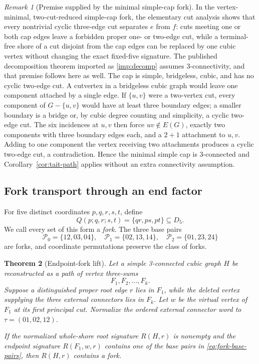\documentclass[11pt]{article}
\newtheorem{theorem}{Theorem}[section]
\theoremstyle{definition}
\theoremstyle{remark}
\newtheorem{remark}[theorem]{Remark}
\begin{document}
\begin{remark}[Premise supplied by the minimal simple-cap fork]
In the vertex-minimal, two-cut-reduced simple-cap fork, the elementary
cut analysis shows that every nontrivial cyclic three-edge cut
separates \(e\) from \(f\): cuts meeting one or both cap edges leave a
forbidden proper one- or two-edge cut, while a terminal-free shore of
a cut disjoint from the cap edges can be replaced by one cubic vertex
without changing the exact fixed-five signature.  The published
decomposition theorem imported as \ref{imp:decomp} assumes
3-connectivity, and that premise follows here as well.  The cap is
simple, bridgeless, cubic, and has no cyclic two-edge cut.  A cutvertex
in a bridgeless cubic graph would leave one component attached by a
single edge.  If \(\{u,v\}\) were a two-vertex cut, every component of
\(G-\{u,v\}\) would have at least three boundary edges; a smaller
boundary is a bridge or, by cubic degree counting and simplicity, a
cyclic two-edge cut.  The six incidences at \(u,v\) then force
\(uv\notin E(G)\), exactly two components with three boundary edges
each, and a \(2+1\) attachment to \(u,v\).  Adding to one component the
vertex receiving two attachments produces a cyclic two-edge cut, a
contradiction.  Hence the minimal simple cap is 3-connected and
Corollary~\ref{cor:tait-path} applies without an extra connectivity
assumption.
\end{remark}

\subsection{Fork transport through an end factor}

For five distinct coordinates \(p,q,r,s,t\), define
\[
                 Q(p;q,r;s,t)=\{qr,ps,pt\}\subseteq D_5.       \tag{6.16}
\]
We call every set of this form a \emph{fork}.  The three base pairs
\[
 \mathcal P_0=\{12,03,04\},\quad
 \mathcal P_1=\{02,13,14\},\quad
 \mathcal P_2=\{01,23,24\}                                  \tag{6.17}
\label{eq:fork-base-pairs}
\]
are forks, and coordinate permutations preserve the class of forks.

\begin{theorem}[Endpoint-fork lift]
\label{thm:endpoint-fork-lift}
Let a simple 3-connected cubic graph \(H\) be reconstructed as a path
of vertex three-sums
\[
                         F_1,F_2,\ldots,F_k.
\]
Suppose a distinguished proper root edge \(r\) lies in \(F_1\), while
the deleted vertex supplying the three external connectors lies in
\(F_k\).  Let \(w\) be the virtual vertex of \(F_1\) at its first
principal cut.  Normalize the ordered external connector word to
\(\tau=(01,02,12)\).

If the normalized whole-shore root signature \(R(H,r)\) is nonempty
and the endpoint signature \(R(F_1,w,r)\) contains one of the base
pairs in \eqref{eq:fork-base-pairs}, then \(R(H,r)\) contains a fork.
\end{theorem}
\end{document}
